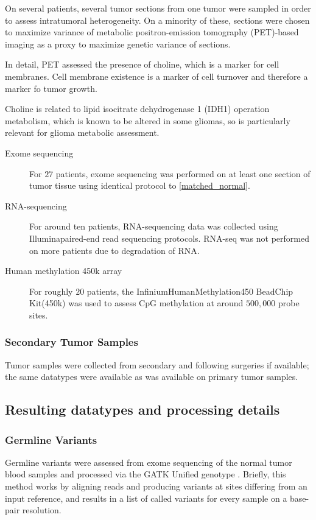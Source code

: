 On several patients, several tumor sections from one tumor were
sampled in order to assess intratumoral heterogeneity. On a minority
of these, sections were chosen to maximize variance of metabolic
positron-emission tomography (PET)-based imaging as a proxy to maximize genetic variance of sections.

In detail, PET assessed the presence of choline, which is a marker
for cell membranes. Cell membrane existence is a marker of cell
turnover and therefore a marker fo tumor growth.

Choline is related to lipid isocitrate dehydrogenase 1 (IDH1)
operation metabolism, which is known to be altered in some gliomas, so
is particularly relevant for glioma metabolic assessment. 

\begin{description}

\item[Exome sequencing] For $27$ patients, exome sequencing was
  performed on at least one section of tumor tissue using identical
  protocol to \ref{matched_normal}.

  
\item[RNA-sequencing] For around ten patients, RNA-sequencing data was
  collected using Illumina\reg paired-end read sequencing
  protocols. RNA-seq was not performed on more patients due to
  degradation of RNA.

  
\item[Human methylation 450k array] For roughly $20$ patients, the
  Infinium\reg HumanMethylation450 BeadChip Kit\tm (450k) was used to assess
  CpG methylation at around $500,000$ probe sites.
  
\end{description}


\subsubsection{Secondary Tumor Samples}

Tumor samples were collected from secondary and following surgeries if
available; the same datatypes were available as was available on
primary tumor samples.

\subsection{Resulting datatypes and processing details}
\subsubsection{Germline Variants}
Germline variants were assessed from exome sequencing of the normal
tumor blood samples and processed via the GATK Unified genotype
. Briefly, this method works by aligning reads and
producing variants at sites differing from an input reference, and
results in a list of called variants for every sample on a base-pair
resolution.


